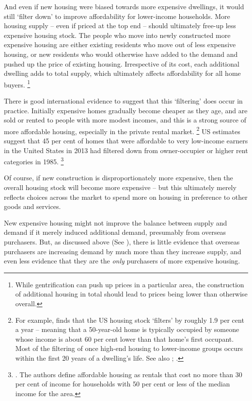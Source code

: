 And even if new housing were biased towards more expensive dwellings, it would still `filter down' to improve affordability for lower-income households.
More housing supply -- even if priced at the top end -- should ultimately free-up less expensive housing stock.
The people who move into newly constructed more expensive housing are either existing residents who move out of less expensive housing, or new residents who would otherwise have added to the demand and pushed up the price of existing housing.
Irrespective of its cost, each additional dwelling adds to total supply, which ultimately affects affordability for all home buyers.%
	\footnote{While gentrification can push up prices in a particular area, the construction of additional housing in total should lead to prices being lower than otherwise overall.}

There is good international evidence to suggest that this `filtering' does occur in practice.
Initially expensive homes gradually become cheaper as they age, and are sold or rented to people with more modest incomes, and this is a strong source of more affordable housing, especially in the private rental market.%
	\footnote{For example, \textcite{Rosenthal2014PrivateMarkets} finds that the US housing stock `filters' by roughly 1.9 per cent a year -- meaning that a 50-year-old home is typically occupied by someone whose income is about 60 per cent lower than that home's first occupant.
	Most of the filtering of once high-end housing to lower-income groups occurs within the first 20 years of a dwelling's life.
	See also \textcite{Taylor2016Perspectives}; \textcite{Somerville-Mayer-2003-govt-reg-affordable-housing}.}
US estimates suggest that 45 per cent of homes that were affordable to very low-income earners in the United States in 2013 had filtered down from owner-occupier or higher rent categories in 1985.%
    \footnote{\textcite{Weicheretal-The-Long-Term-Dynamics-of-Affordable-Rental-Housing}. The authors define affordable housing as rentals that cost no more than 30 per cent of income for households with 50 per cent or less of the median income for the area.}

Of course, if new construction is disproportionately more expensive, then the overall housing stock will become more expensive -- but this ultimately merely reflects choices across the market to spend more on housing in preference to other goods and services.

New expensive housing might not improve the balance between supply and demand if it merely induced additional demand, presumably from overseas purchasers.
But, as discussed above (See ), there is little evidence that overseas purchasers are increasing demand by much more than they increase supply, and even less evidence that they are the \emph{only} purchasers of more expensive housing.

